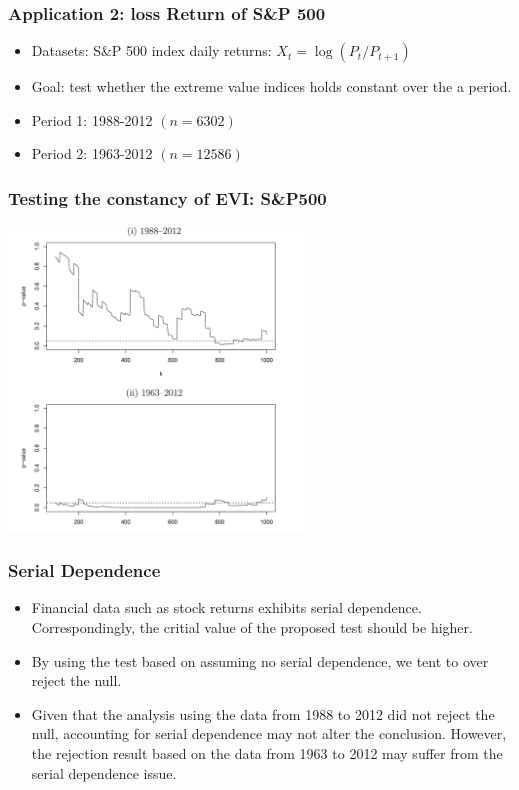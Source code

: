 \documentclass{beamer}
\begin{document}
\begin{frame}
    \frametitle{Application 2: loss Return of S\&P 500}

   \begin{itemize}
       \item  Datasets: S\&P 500 index daily returns: $X_t=\log (P_t/P_{t+1})$
       \bigskip
       \item Goal: test whether the extreme value indices holds constant over the a period.
       \bigskip
       \item Period 1:  1988-2012 $(n=6302)$
       \item  Period 2: 1963-2012 $(n=12586)$
       \bigskip
 
   \end{itemize} 
\end{frame}

\begin{frame}
    \frametitle{Testing the constancy of EVI: S\&P500}
\begin{center}
    \includegraphics[width=0.6\textwidth]{image-20200429230846070}
\end{center}
    

\end{frame}

\begin{frame}
    \frametitle{Serial Dependence}
\begin{itemize}
    \item Financial data such as stock returns exhibits serial dependence. Correspondingly, the critial value of the proposed test should be higher.
    \bigskip
    \item By using the test based on assuming no serial dependence, we tent to over reject the null.
    \bigskip
    \item Given that the analysis using the data from 1988 to 2012 did not reject the null, accounting for serial dependence may not alter the conclusion. However, the rejection result based on the data from 1963 to 2012 may suffer from the serial dependence issue. 
\end{itemize}
    

\end{frame}
\end{document}
